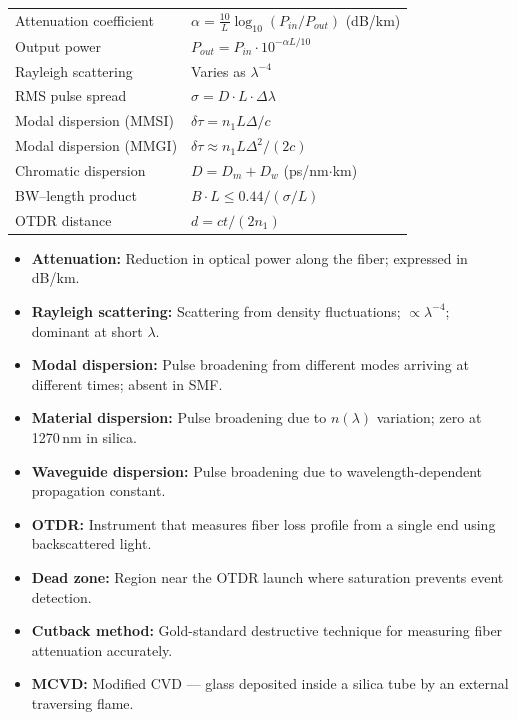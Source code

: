 \documentclass[12pt,a4paper]{article}
\renewcommand{\arraystretch}{1.45}
\begin{document}
\begin{tcolorbox}[formulabox, title={\textbf{Key Formulas at a Glance}}]
\renewcommand{\arraystretch}{1.35}
\begin{tabularx}{\linewidth}{B{5.0cm} X}
Attenuation coefficient & $\alpha = \displaystyle\frac{10}{L}\log_{10}(P_{in}/P_{out})$ \quad (dB/km) \\[6pt]
Output power & $P_{out} = P_{in} \cdot 10^{-\alpha L/10}$ \\[4pt]
Rayleigh scattering & Varies as $\lambda^{-4}$ \\[4pt]
RMS pulse spread & $\sigma = D \cdot L \cdot \Delta\lambda$ \\[4pt]
Modal dispersion (MMSI) & $\delta\tau = n_1 L \Delta / c$ \\[4pt]
Modal dispersion (MMGI) & $\delta\tau \approx n_1 L \Delta^2 / (2c)$ \\[4pt]
Chromatic dispersion & $D = D_m + D_w$ \quad (ps/nm$\cdot$km) \\[4pt]
BW--length product & $B \cdot L \leq 0.44/(\sigma/L)$ \\[4pt]
OTDR distance & $d = ct / (2n_1)$ \\[4pt]
\end{tabularx}
\end{tcolorbox}

\begin{tcolorbox}[defbox, title={\textbf{One-Line Definitions}}]
\begin{itemize}[leftmargin=*, itemsep=2pt, topsep=0pt]
  \item \textbf{Attenuation:} Reduction in optical power along the fiber; expressed in dB/km.
  \item \textbf{Rayleigh scattering:} Scattering from density fluctuations; $\propto \lambda^{-4}$; dominant at short $\lambda$.
  \item \textbf{Modal dispersion:} Pulse broadening from different modes arriving at different times; absent in SMF.
  \item \textbf{Material dispersion:} Pulse broadening due to $n(\lambda)$ variation; zero at 1270\,nm in silica.
  \item \textbf{Waveguide dispersion:} Pulse broadening due to wavelength-dependent propagation constant.
  \item \textbf{OTDR:} Instrument that measures fiber loss profile from a single end using backscattered light.
  \item \textbf{Dead zone:} Region near the OTDR launch where saturation prevents event detection.
  \item \textbf{Cutback method:} Gold-standard destructive technique for measuring fiber attenuation accurately.
  \item \textbf{MCVD:} Modified CVD --- glass deposited inside a silica tube by an external traversing flame.
\end{itemize}
\end{tcolorbox}
\end{document}
